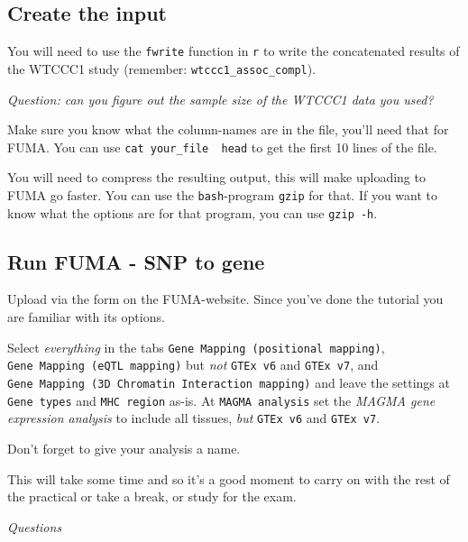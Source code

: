 \documentclass[
]{book}
\begin{document}
\hypertarget{create-the-input}{%
\subsection{Create the input}\label{create-the-input}}

You will need to use the \texttt{fwrite} function in \texttt{r} to write the concatenated results of the WTCCC1 study (remember: \texttt{wtccc1\_assoc\_compl}).

\emph{Question: can you figure out the sample size of the WTCCC1 data you used?}

Make sure you know what the column-names are in the file, you'll need that for FUMA. You can use \texttt{cat\ your\_file\ \textbar{}\ head} to get the first 10 lines of the file.

You will need to compress the resulting output, this will make uploading to FUMA go faster. You can use the \texttt{bash}-program \texttt{gzip} for that. If you want to know what the options are for that program, you can use \texttt{gzip\ -h}.

\hypertarget{run-fuma---snp-to-gene}{%
\subsection{Run FUMA - SNP to gene}\label{run-fuma---snp-to-gene}}

Upload via the form on the FUMA-website. Since you've done the tutorial you are familiar with its options.

Select \emph{everything} in the tabs \texttt{Gene\ Mapping\ (positional\ mapping)}, \texttt{Gene\ Mapping\ (eQTL\ mapping)} but \emph{not} \texttt{GTEx\ v6} and \texttt{GTEx\ v7}, and \texttt{Gene\ Mapping\ (3D\ Chromatin\ Interaction\ mapping)} and leave the settings at \texttt{Gene\ types} and \texttt{MHC\ region} as-is. At \texttt{MAGMA\ analysis} set the \emph{MAGMA gene expression analysis} to include all tissues, \emph{but} \texttt{GTEx\ v6} and \texttt{GTEx\ v7}.

Don't forget to give your analysis a name.

This will take some time and so it's a good moment to carry on with the rest of the practical or take a break, or study for the exam.

\emph{Questions}
\end{document}
